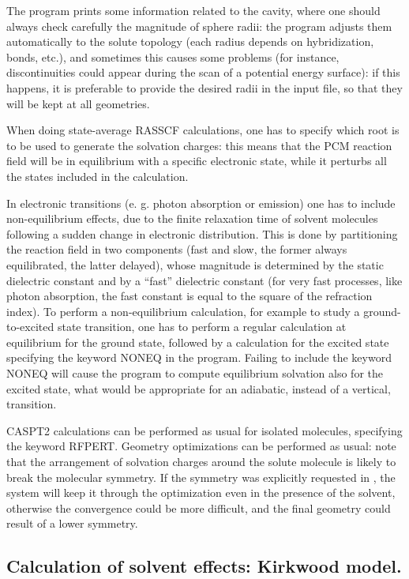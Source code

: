 The program prints some information related to the cavity, where one should
always check carefully the magnitude of sphere radii: the program adjusts them
automatically to the solute topology (each radius depends on
hybridization, bonds, etc.), and sometimes this causes some 
problems (for instance, discontinuities could appear during the scan 
of a potential energy surface): if this happens, it is preferable to provide
the desired radii in the input file, so that they will be kept at all
geometries.

When doing state-average RASSCF calculations, one has to specify which root is
to be used to generate the solvation charges: this means that the PCM reaction
field will be in equilibrium with a specific electronic state, while it 
perturbs all the states included in the calculation.

In electronic transitions (e. g. photon absorption or emission) one has to include
non-equilibrium effects, due to the finite relaxation time of solvent molecules 
following a sudden change in electronic distribution. This is done by partitioning the 
reaction field in two components (fast and slow, the former always equilibrated,
the latter delayed), whose magnitude is determined by the static dielectric constant 
and by a ``fast'' dielectric constant \cite{Cossi:00} (for very fast processes, like
photon absorption, the fast constant is equal to the square of the refraction index).
To perform a non-equilibrium calculation, for example to study a ground-to-excited state
transition, one has to perform a regular calculation at equilibrium for the ground state,
followed by a calculation for the excited state specifying the keyword NONEQ in the
 program. Failing to include the keyword NONEQ will cause the program
to compute equilibrium solvation also for the excited state, what would be appropriate
for an adiabatic, instead of a vertical, transition.

CASPT2 calculations can be performed as usual for isolated molecules, specifying
the keyword RFPERT. Geometry optimizations can be performed as usual: note that
the arrangement of solvation charges around the solute molecule is likely
to break the molecular symmetry. If the symmetry was explicitly requested in 
, the system will keep it through the optimization even in the 
presence of the solvent, otherwise the convergence could be more difficult, and
the final geometry could result of a lower symmetry.


\subsection{Calculation of solvent effects: Kirkwood model.}

